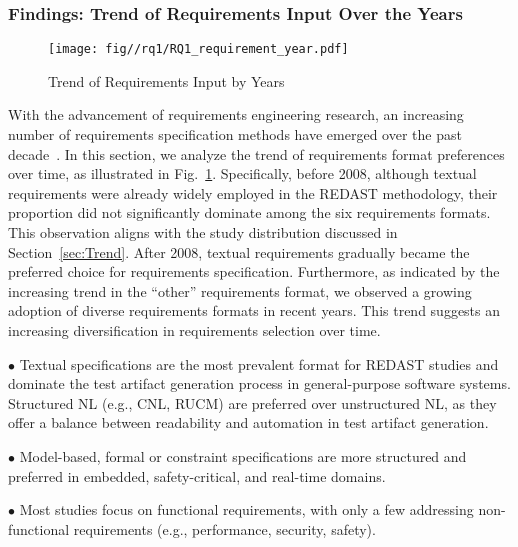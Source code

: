 \subsubsection{Findings: Trend of Requirements Input Over the Years}

\begin{figure}
    \centering
    \texttt{[image: fig//rq1/RQ1\_requirement\_year.pdf]}
    \caption{Trend of Requirements Input by Years}
    \label{fig:requirements_year}
\end{figure}

With the advancement of requirements engineering research, an increasing number of requirements specification methods have emerged over the past decade~\cite{software_requirements_specification_01,software_requirements_specification_02}. In this section, we analyze the trend of requirements format preferences over time, as illustrated in Fig.~\ref{fig:requirements_year}. Specifically, before 2008, although textual requirements were already widely employed in the REDAST methodology, their proportion did not significantly dominate among the six requirements formats. This observation aligns with the study distribution discussed in Section~\ref{sec:Trend}. After 2008, textual requirements gradually became the preferred choice for requirements specification. Furthermore, as indicated by the increasing trend in the “other” requirements format, we observed a growing adoption of diverse requirements formats in recent years. This trend suggests an increasing diversification in requirements selection over time.

\begin{tcolorbox}[mybox, title=RQ1 Key Takeaways]
$\bullet$ Textual specifications are the most prevalent format for REDAST studies and dominate the test artifact generation process in general-purpose software systems. Structured NL (e.g., CNL, RUCM) are preferred over unstructured NL, as they offer a balance between readability and automation in test artifact generation.

$\bullet$ Model-based, formal or constraint specifications are more structured and preferred in embedded, safety-critical, and real-time domains.

$\bullet$ Most studies focus on functional requirements, with only a few addressing non-functional requirements (e.g., performance, security, safety).
\end{tcolorbox}